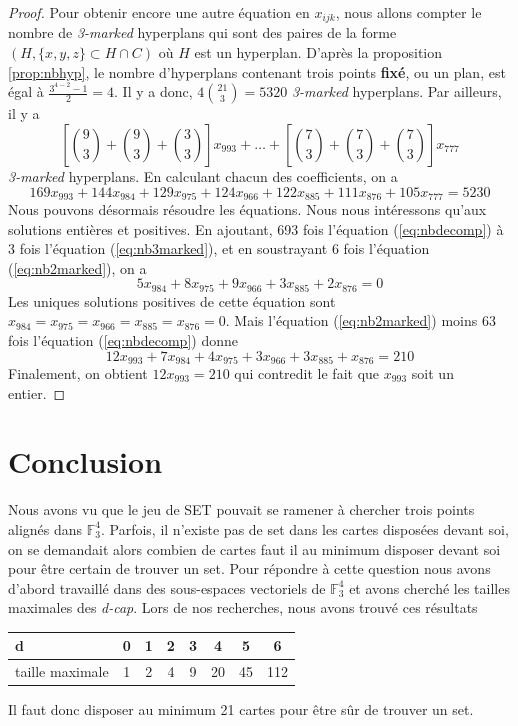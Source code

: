 \documentclass[a4paper,12pt,titlepage]{article}
\theoremstyle{plain}
\theoremstyle{definition}
\newcommand{\Ftrois}[1]{\mathbb{F}^#1_3}
\begin{document}
\begin{proof}
  Pour obtenir encore une autre équation en $x_{ijk}$, nous allons compter le nombre de \emph{3-marked} hyperplans qui sont des paires de la forme $(H,\{x,y,z\} \subset H \cap C)$ où $H$ est un hyperplan. D'après la proposition \ref{prop:nbhyp}, le nombre d'hyperplans contenant trois points \textbf{fixé}, ou un plan, est égal à $\frac{3^{4-2}-1}{2} = 4$. Il y a donc, $4 \binom{21}{3} = 5320$ \emph{3-marked} hyperplans. Par ailleurs, il y a 
  \[
  \left[\binom{9}{3}+\binom{9}{3}+\binom{3}{3}\right]x_{993} + \dots + \left[\binom{7}{3}+\binom{7}{3}+\binom{7}{3}\right]x_{777}
  \]
  \emph{3-marked} hyperplans. En calculant chacun des coefficients, on a
  \begin{equation} \label{eq:nb3marked}
    169x_{993} + 144x_{984} + 129x_{975} + 124x_{966} + 122x_{885} + 111x_{876} + 105x_{777} = 5230
  \end{equation}
  Nous pouvons désormais résoudre les équations. Nous nous intéressons qu'aux solutions entières et positives. En ajoutant, 693 fois l'équation (\ref{eq:nbdecomp}) à 3 fois l'équation (\ref{eq:nb3marked}), et en soustrayant 6 fois l'équation (\ref{eq:nb2marked}), on a
  \[
  5x_{984} + 8x_{975} + 9x_{966} + 3x_{885} + 2x_{876} = 0
  \]
  Les uniques solutions positives de cette équation sont $x_{984} = x_{975} = x_{966} = x_{885} = x_{876} = 0$. Mais l'équation (\ref{eq:nb2marked}) moins 63 fois l'équation (\ref{eq:nbdecomp}) donne
  \[
  12x_{993} + 7x_{984} + 4x_{975} + 3x_{966} + 3x_{885} + x_{876} = 210
  \]
  Finalement, on obtient $12x_{993} = 210$ qui contredit le fait que $x_{993}$ soit un entier.
\end{proof}

\section{Conclusion}
Nous avons vu que le jeu de SET pouvait se ramener à chercher trois points alignés dans $\Ftrois{4}$.
Parfois, il n'existe pas de set dans les cartes disposées devant soi, on se demandait alors combien de cartes faut il au minimum disposer devant soi pour être certain de trouver un set.
Pour répondre à cette question nous avons d'abord travaillé dans des sous-espaces vectoriels de $\Ftrois{4}$
et avons cherché les tailles maximales des \emph{d-cap}. Lors de nos recherches, nous avons trouvé ces résultats

\begin{center}
  \begin{tabular}{ l | *{7}{c} }
    d & 0 & 1 & 2 & 3 & 4 & 5 & 6\\
    \hline
    taille maximale & 1 & 2 & 4 & 9 & 20 & 45 & 112 \\
  \end{tabular}
\end{center}

Il faut donc disposer au minimum 21 cartes pour être sûr de trouver un set.



\nocite{*}
\end{document}

